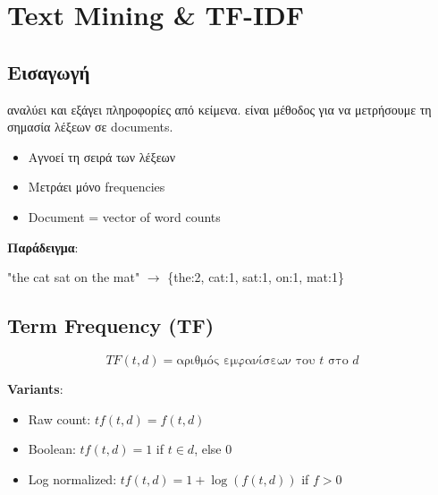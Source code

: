 
\chapter{Text Mining \& TF-IDF}

\section{Εισαγωγή}

 αναλύει και εξάγει πληροφορίες από κείμενα.  είναι μέθοδος για να μετρήσουμε τη σημασία λέξεων σε documents.

\begin{definitionbox}
\begin{itemize}
    \item Αγνοεί τη σειρά των λέξεων
    \item Μετράει μόνο frequencies
    \item Document = vector of word counts
\end{itemize}

\textbf{Παράδειγμα}:

"the cat sat on the mat" $\to$ \{the:2, cat:1, sat:1, on:1, mat:1\}
\end{definitionbox}

\section{Term Frequency (TF)}

\begin{formulabox}
\begin{equation}
TF(t, d) = \text{αριθμός εμφανίσεων του } t \text{ στο } d
\end{equation}

\textbf{Variants}:
\begin{itemize}
    \item Raw count: $tf(t,d) = f(t,d)$
    \item Boolean: $tf(t,d) = 1$ if $t \in d$, else $0$
    \item Log normalized: $tf(t,d) = 1 + \log(f(t,d))$ if $f > 0$
\end{itemize}
\end{formulabox}

